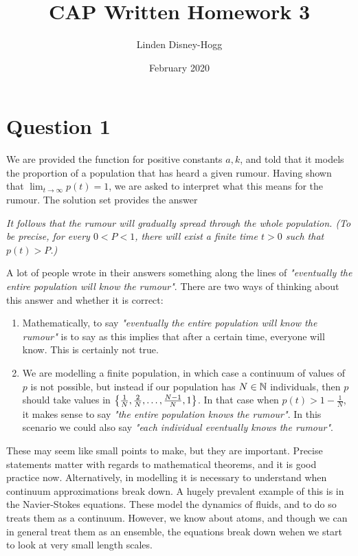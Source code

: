 \documentclass{article}
\title{CAP Written Homework 3}
\author{Linden Disney-Hogg}
\date{February 2020}
\begin{document}
\maketitle

\section{Question 1}

We are provided the function 
for positive constants $a,k$, and told that it models the proportion of a population that has heard a given rumour. Having shown that $\lim_{t \to \infty} p(t) = 1$, we are asked to interpret what this means for the rumour. The solution set provides the answer 
\begin{displayquote}
\textit{It follows that the rumour will gradually spread through the whole population. (To be precise, for every
$0 < P < 1$, there will exist a finite time $t > 0$ such that $p(t) > P$.)}
\end{displayquote}
A lot of people wrote in their answers something along the lines of \textit{"eventually the entire population will know the rumour"}. There are two ways of thinking about this answer and whether it is correct:
\begin{enumerate}
    \item Mathematically, to say \textit{"eventually the entire population will know the rumour"} is to say 
    as this implies that after a certain time, everyone will know. This is certainly not true.
    \item We are modelling a finite population, in which case a continuum of values of $p$ is not possible, but instead if our population has $N \in \mathbb{N}$ individuals, then $p$ should take values in $\left\{ \frac{1}{N}, \frac{2}{N}, \dots, \frac{N-1}{N}, 1 \right\}$. In that case when $p(t) > 1-\frac{1}{N}$, it makes sense to say \textit{"the entire population knows the rumour"}. In this scenario we could also say \textit{"each individual eventually knows the rumour"}.
\end{enumerate}
These may seem like small points to make, but they are important. Precise statements matter with regards to mathematical theorems, and it is good practice now. Alternatively, in modelling it is necessary to understand when continuum approximations break down. A hugely prevalent example of this is in the Navier-Stokes equations. These model the dynamics of fluids, and to do so treats them as a continuum. However, we know about atoms, and though we can in general treat them as an ensemble, the equations break down wehen we start to look at very small length scales. 
\end{document}
